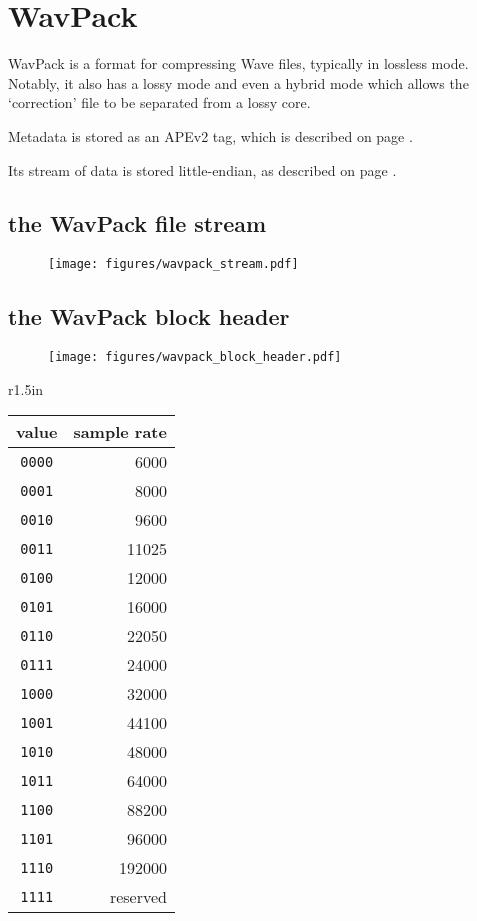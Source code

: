 
\chapter{WavPack}
WavPack is a format for compressing Wave files, typically in lossless mode.
Notably, it also has a lossy mode and even a hybrid mode which allows
the `correction' file to be separated from a lossy core.

Metadata is stored as an APEv2 tag, which is described on page \pageref{apev2}.

Its stream of data is stored little-endian, as described on page
\pageref{bitstreams}.

\section{the WavPack file stream}
\begin{figure}[h]
\texttt{[image: figures/wavpack\_stream.pdf]}
\end{figure}

\clearpage

\section{the WavPack block header}
\begin{figure}[h]
\texttt{[image: figures/wavpack\_block\_header.pdf]}
\end{figure}
\begin{wrapfigure}[10]{r}{1.5in}
\begin{tabular}{|c|r|}
\hline
value & sample rate \\
\hline
\texttt{0000} & 6000 \\
\texttt{0001} & 8000 \\
\texttt{0010} & 9600 \\
\texttt{0011} & 11025 \\
\texttt{0100} & 12000 \\
\texttt{0101} & 16000 \\
\texttt{0110} & 22050 \\
\texttt{0111} & 24000 \\
\texttt{1000} & 32000 \\
\texttt{1001} & 44100 \\
\texttt{1010} & 48000 \\
\texttt{1011} & 64000 \\
\texttt{1100} & 88200 \\
\texttt{1101} & 96000 \\
\texttt{1110} & 192000 \\
\texttt{1111} & reserved \\
\hline
\end{tabular}
\end{wrapfigure}

